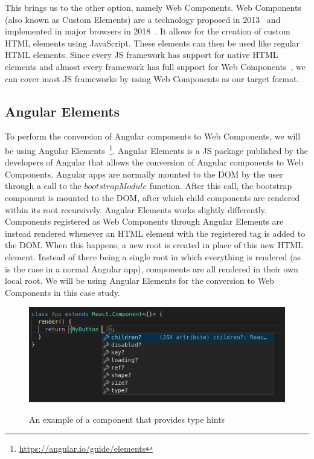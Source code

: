 This brings us to the other option, namely Web Components. Web Components (also known as Custom Elements) are a technology proposed in 2013~\cite{customelements-initial} and implemented in major browsers in 2018~\cite{webcomponents-support}. It allows for the creation of custom HTML elements using JavaScript. These elements can then be used like regular HTML elements. Since every JS framework has support for native HTML elements and almost every framework has full support for Web Components~\cite{custom-elements-everyhwere}, we can cover most JS frameworks by using Web Components as our target format.

\subsection{Angular Elements}\label{sec:bg-angularelements}
To perform the conversion of Angular components to Web Components, we will be using Angular Elements~\footnote{\url{https://angular.io/guide/elements}}. Angular Elements is a JS package published by the developers of Angular that allows the conversion of Angular components to Web Components. Angular apps are normally mounted to the DOM by the user through a call to the \(bootstrapModule\) function. After this call, the bootstrap component is mounted to the DOM, after which child components are rendered within its root recursively. Angular Elements works slightly differently. Components registered as Web Components through Angular Elements are instead rendered whenever an HTML element with the registered tag is added to the DOM\@. When this happens, a new root is created in place of this new HTML element. Instead of there being a single root in which everything is rendered (as is the case in a normal Angular app), components are all rendered in their own local root. We will be using Angular Elements for the conversion to Web Components in this case study.

\begin{figure}[h]
	\caption{An example of a component that provides type hints}
	\includegraphics[width=\columnwidth]{figures/background/hinting.png}
	\label{fig:bg-hinting}
	\centering
\end{figure}

